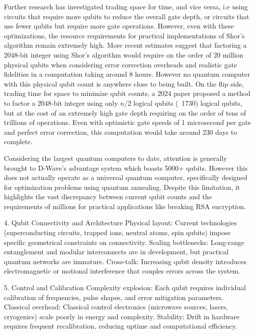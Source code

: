\documentclass{elbioimp2}
\begin{document}
Further research has investigated trading space for time, and vice versa, i.e using circuits that require more qubits to reduce the overall gate depth, or circuits that use fewer qubits but require more gate operations. However, even with these optimizations, the resource requirements for practical implementations of Shor's algorithm remain extremely high. More recent estimates suggest that factoring a 2048-bit integer using Shor's algorithm would require on the order of 20 million physical qubits when considering error correction overheads and realistic gate fidelities\cite{Gidney_2021} in a computation taking around 8 hours. However no quantum computer with this physical qubit count is anywhere close to being built. On the flip side, trading time for space to minimize qubit counts, a 2024 paper proposed a method to factor a 2048-bit integer using only $n/2$ logical qubits (~1730) logical qubits, but at the cost of an extremely high gate depth requiring on the order of tens of trillions of operations\cite{10.1007/978-3-032-01878-6_13}. Even with optimistic gate speeds of 1 microsecond per gate and perfect error correction, this computation would take around 230 days to complete.

Considering the largest quantum computers to date, attention is generally brought to D-Wave's advantage system which boasts 5000+ qubits\cite{NatureQC2023}. However this does not actually operate as a universal quantum computer, specifically designed for optimization problems using quantum annealing. Despite this limitation, it highlights the vast discrepancy between current qubit counts and the requirements of millions for practical applications like breaking RSA encryption.


4. Qubit Connectivity and Architecture
Physical layout: Current technologies (superconducting circuits, trapped ions, neutral atoms, spin qubits) impose specific geometrical constraints on connectivity.
Scaling bottlenecks: Long-range entanglement and modular interconnects are in development, but practical quantum networks are immature.
Cross-talk: Increasing qubit density introduces electromagnetic or motional interference that couples errors across the system.

5. Control and Calibration
Complexity explosion: Each qubit requires individual calibration of frequencies, pulse shapes, and error mitigation parameters.
Classical overhead: Classical control electronics (microwave sources, lasers, cryogenics) scale poorly in energy and complexity.
Stability: Drift in hardware requires frequent recalibration, reducing uptime and computational efficiency.
\end{document}
